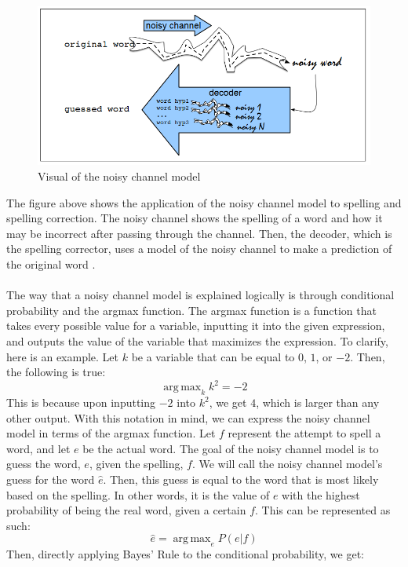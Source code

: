 \documentclass[12pt]{article}
\numberwithin{equation}{section}
\DeclareMathOperator*{\argmax}{arg\,max}
\begin{document}
\begin{figure}[h]
    \centering
    \includegraphics[width=0.8\columnwidth]{ncm.png}
    \caption{Visual of the noisy channel model}
\end{figure}

The figure above shows the application of the noisy channel model to spelling and spelling correction. The noisy channel shows the spelling of a word and how it may be incorrect after passing through the channel. Then, the decoder, which is the spelling corrector, uses a model of the noisy channel to make a prediction of the original word \cite{daniel_martin_2021}.
\\\\
The way that a noisy channel model is explained logically is through conditional probability and the argmax function. The argmax function is a function that takes every possible value for a variable, inputting it into the given expression, and outputs the value of the variable that maximizes the expression. To clarify, here is an example. Let $k$ be a variable that can be equal to $0$, $1$, or $-2$. Then, the following is true:
\begin{equation} \argmax_k{k^2}=-2 \end{equation}
This is because upon inputting $-2$ into $k^2$, we get $4$, which is larger than any other output.
With this notation in mind, we can express the noisy channel model in terms of the argmax function. Let $f$ represent the attempt to spell a word, and let $e$ be the actual word. The goal of the noisy channel model is to guess the word, $e$, given the spelling, $f$. We will call the noisy channel model's guess for the word $\hat{e}$. Then, this guess is equal to the word that is most likely based on the spelling. In other words, it is the value of $e$ with the highest probability of being the real word, given a certain $f$. This can be represented as such:
\begin{equation} \hat{e}=\argmax_e{P(e|f)} \end{equation}
Then, directly applying Bayes' Rule to the conditional probability, we get:
\end{document}
